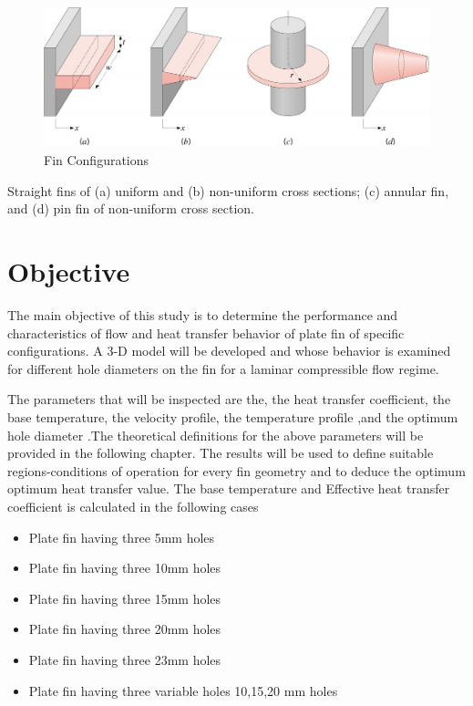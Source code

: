 \begin{figure}[h]
	 \label{ss}    %
	 \centering
	 \includegraphics[width= 14 cm]{101.jpg}
	 \caption{ Fin Configurations}
	  \end{figure}
	  
	  Straight fins of (a) uniform and (b) non-uniform cross sections; (c) annular fin, and (d) pin fin of non-uniform cross section.
	  
	  
\section{Objective}

 The main objective of this study is to determine the performance and characteristics of flow and heat transfer behavior of plate fin of specific configurations. A 3-D model will be developed and whose behavior is examined for different hole diameters on the fin for a laminar compressible flow regime.
 
 The parameters that will be inspected are the, the heat
 transfer coefficient, the base temperature, the velocity profile, the temperature profile ,and the optimum hole diameter .The theoretical definitions for the above parameters will be provided in the following chapter. The results will be used to define suitable regions-conditions of operation for every fin geometry and to deduce the optimum optimum heat transfer value. 
 The base temperature and Effective heat transfer coefficient is calculated in the following cases
 
  \begin{itemize}
  \item{Plate fin having three 5mm holes}
  \item{Plate fin having three 10mm holes  }
  \item{Plate fin having three 15mm holes}
  \item{Plate fin having three 20mm holes  }
 \item{Plate fin having three 23mm holes  }
 \item{Plate fin having three variable holes 10,15,20 mm holes  }
 \end{itemize}
	
